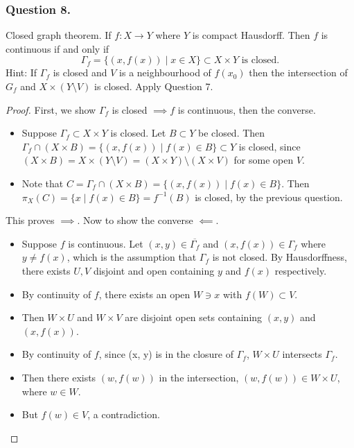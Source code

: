 \documentclass[12pt]{article}
\begin{document}
\subsubsection*{Question 8.} Closed graph theorem.
If $f: X \rightarrow Y$ where $Y$ is compact Hausdorff.
Then $f$ is continuous if and only if 
\begin{equation*}
    \Gamma_f = \{(x, f(x)) \mid x \in X\} \subset X \times Y  \text{ is closed.}
\end{equation*}
Hint: If $\Gamma_f$ is closed and $V$ is a neighbourhood of $f(x_0)$
then the intersection of $G_f$ and $X \times (Y \setminus V)$ is closed. Apply Question 7.

\begin{proof}
    First, we show $\Gamma_f$ is closed $\implies f$ is continuous, then the converse.
    \begin{itemize}
        \item Suppose $\Gamma_f \subset X \times Y$ is closed. 
        Let $B \subset Y$ be closed. Then $\Gamma_f \cap (X \times B)
        = \{(x, f(x)) \mid f(x) \in B\} \subset Y$
        is closed, since $(X \times B) = X \times (Y\setminus V) = (X \times Y) \setminus (X \times V)$
        for some open $V$.
        \item Note that $C = \Gamma_f \cap (X \times B) = \{(x, f(x)) \mid f(x) \in B\}$.
        Then $\pi_X(C) = \{x \mid f(x) \in B\} = f^{-1}(B)$ is closed, by the previous question.
    \end{itemize}
    This proves $\implies$. Now to show the converse $\impliedby$.
    \begin{itemize}
        \item Suppose $f$ is continuous. Let $(x, y) \in \overline{\Gamma_f}$
        and $(x, f(x)) \in \Gamma_f$ where $y \ne f(x)$, which is the assumption that $\Gamma_f$ is not closed.
        By Hausdorffness, there exists $U, V$ disjoint and open containing $y$ 
        and $f(x)$ respectively. 
        \item By continuity of $f$, there exists an open $W \ni x$ with $f(W) \subset V$. 
        \item Then $W \times U$ and $W \times V$
        are disjoint open sets containing $(x, y)$ and $(x, f(x))$.
        \item By continuity of $f$, since (x, y) is in the closure of $\Gamma_f$,
        $W \times U$ intersects $\Gamma_f$.
        \item Then there exists $(w, f(w))$ in the intersection, $(w, f(w)) \in W \times U$,
        where $w \in W$.
        \item But $f(w) \in V$, a contradiction.
    \end{itemize}
\end{proof}
\end{document}

